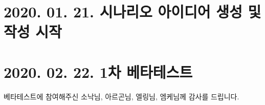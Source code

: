 \documentclass{report}
\begin{document}
	\section*{2020. 01. 21. 시나리오 아이디어 생성 및 작성 시작}
	
	\section*{2020. 02. 22. 1차 베타테스트}
	베타테스트에 참여해주신 소낙님, 아르곤님, 엘링님, 엠케님께 감사를 드립니다.
\end{document}
